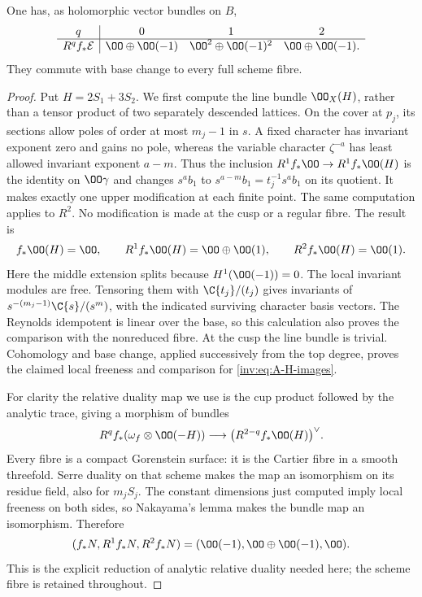 \begin{proposition}\label{inv:A1.2}
One has, as holomorphic vector bundles on $B$,
\[
\begin{array}{c|ccc}
q&0&1&2\\\hline
R^qf_*\mathcal E&\OO\oplus\OO(-1)&
 \OO^2\oplus\OO(-1)^2&\OO\oplus\OO(-1).
\end{array}
\]
They commute with base change to every full scheme fibre.
\end{proposition}
\begin{proof}
Put $H=2S_1+3S_2$.  We first compute the line bundle $\OO_X(H)$,
rather than a tensor product of two separately descended lattices.
On the cover at $p_j$, its sections allow poles of order at most $m_j-1$
in $s$.  A fixed character has invariant exponent zero and gains no
pole, whereas the variable character $\zeta^{-a}$ has least allowed
invariant exponent $a-m$.  Thus the inclusion
$R^1f_*\OO\to R^1f_*\OO(H)$ is the identity on $\OO\gamma$ and
changes $s^ab_1$ to $s^{a-m}b_1=t_j^{-1}s^ab_1$ on its quotient.
It makes exactly one upper modification at each finite point.
The same computation applies to $R^2$.  No modification is made at
the cusp or a regular fibre.  The result is
\begin{equation}\label{inv:eq:A-H-images}
f_*\OO(H)=\OO,\qquad
R^1f_*\OO(H)=\OO\oplus\OO(1),\qquad
R^2f_*\OO(H)=\OO(1).
\end{equation}
Here the middle extension splits because $H^1(\OO(-1))=0$.
The local invariant modules are free.  Tensoring them with
$\C\{t_j\}/(t_j)$ gives invariants of
$s^{-(m_j-1)}\C\{s\}/(s^m)$, with the indicated surviving character
basis vectors.  The Reynolds idempotent is linear over the base,
so this calculation also proves the comparison with the nonreduced
fibre.  At the cusp the line bundle is trivial.  Cohomology and base
change, applied successively from the top degree, proves the claimed
local freeness and comparison for \eqref{inv:eq:A-H-images}.

For clarity the relative duality map we use is the cup product followed
by the analytic trace, giving a morphism of bundles
\[
R^qf_*(\omega_f\otimes\OO(-H))\longrightarrow
\bigl(R^{2-q}f_*\OO(H)\bigr)^\vee.
\]
Every fibre is a compact Gorenstein surface: it is the Cartier fibre
in a smooth threefold.  Serre duality on that scheme makes the map
an isomorphism on its residue field, also for $m_jS_j$.  The constant
dimensions just computed imply local freeness on both sides, so
Nakayama's lemma makes the bundle map an isomorphism.  Therefore
\begin{equation}\label{inv:eq:A-N-images}
(f_*N,R^1f_*N,R^2f_*N)
=(\OO(-1),\OO\oplus\OO(-1),\OO).
\end{equation}
This is the explicit reduction of analytic relative duality needed
here; the scheme fibre is retained throughout.


\end{proof}
